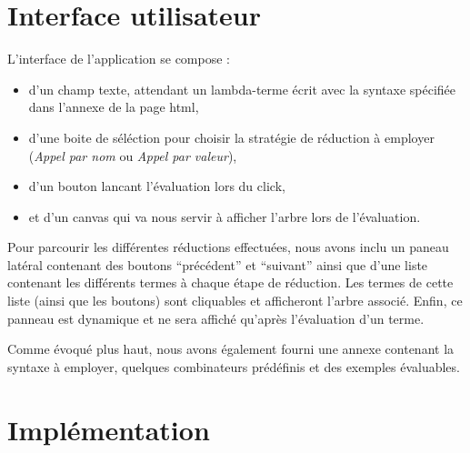 \documentclass[11pt,a4paper]{report}
\begin{document}
\section{Interface utilisateur}

L'interface de l'application se compose : 
\begin{itemize}

\item d'un champ texte, attendant un lambda-terme écrit avec la
  syntaxe spécifiée dans l'annexe de la page html,

\item d'une boite de séléction pour choisir la stratégie de réduction
  à employer (\emph{Appel par nom} ou \emph{Appel par valeur}),

\item d'un bouton lancant l'évaluation lors du click,

\item et d'un canvas qui va nous servir à afficher l'arbre lors de
  l'évaluation.
\end{itemize}

Pour parcourir les différentes réductions effectuées, nous avons inclu
un paneau latéral contenant des boutons ``précédent'' et ``suivant''
ainsi que d'une liste contenant les différents termes à chaque étape
de réduction. Les termes de cette liste (ainsi que les boutons) sont
cliquables et afficheront l'arbre associé. Enfin, ce panneau est
dynamique et ne sera affiché qu'après l'évaluation d'un terme.

Comme évoqué plus haut, nous avons également fourni une annexe
contenant la syntaxe à employer, quelques combinateurs prédéfinis
et des exemples évaluables.


\section{Implémentation}
\end{document}
